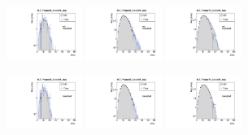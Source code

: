 \begin{figure}[ht]
 \centering
    \includegraphics[width=0.22\textwidth]{figures/resolution/eventSelection/NVtxComparisonWoWeights1.pdf}
    \includegraphics[width=0.22\textwidth]{figures/resolution/eventSelection/NVtxComparisonWoWeights2.pdf}
    \includegraphics[width=0.22\textwidth]{figures/resolution/eventSelection/NVtxComparisonWoWeights3.pdf}

    \includegraphics[width=0.22\textwidth]{figures/resolution/eventSelection/NVtxComparison1.pdf}
    \includegraphics[width=0.22\textwidth]{figures/resolution/eventSelection/NVtxComparison2.pdf}
    \includegraphics[width=0.22\textwidth]{figures/resolution/eventSelection/NVtxComparison3.pdf}


\end{figure}
